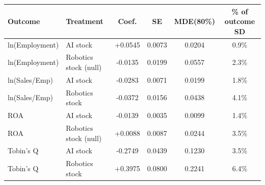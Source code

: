 \begin{tabular}{llcccc}
\toprule
Outcome & Treatment & Coef. & SE & MDE(80\%) & \% of outcome SD \\
\midrule
ln(Employment) & AI stock & +0.0545 & 0.0073 & 0.0204 & 0.9\% \\
ln(Employment) & Robotics stock (null) & -0.0135 & 0.0199 & 0.0557 & 2.3\% \\
ln(Sales/Emp) & AI stock & -0.0283 & 0.0071 & 0.0199 & 1.8\% \\
ln(Sales/Emp) & Robotics stock & -0.0372 & 0.0156 & 0.0438 & 4.1\% \\
ROA & AI stock & -0.0139 & 0.0035 & 0.0099 & 1.4\% \\
ROA & Robotics stock (null) & +0.0088 & 0.0087 & 0.0244 & 3.5\% \\
Tobin's Q & AI stock & -0.2749 & 0.0439 & 0.1230 & 3.5\% \\
Tobin's Q & Robotics stock & +0.3975 & 0.0800 & 0.2241 & 6.4\% \\
\bottomrule
\end{tabular}